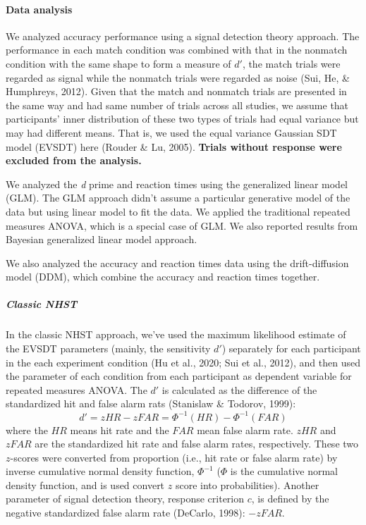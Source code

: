 \documentclass[
  english,
  man]{apa6}
\let\oldparagraph\paragraph
\renewcommand{\paragraph}[1]{\oldparagraph{#1}\mbox{}}
\let\oldsubparagraph\subparagraph
\renewcommand{\subparagraph}[1]{\oldsubparagraph{#1}\mbox{}}
\begin{document}
\hypertarget{data-analysis}{%
\paragraph{Data analysis}\label{data-analysis}}

We analyzed accuracy performance using a signal detection theory approach. The performance in each match condition was combined with that in the nonmatch condition with the same shape to form a measure of \(d'\), the match trials were regarded as signal while the nonmatch trials were regarded as noise (Sui, He, \& Humphreys, 2012). Given that the match and nonmatch trials are presented in the same way and had same number of trials across all studies, we assume that participants' inner distribution of these two types of trials had equal variance but may had different means. That is, we used the equal variance Gaussian SDT model (EVSDT) here (Rouder \& Lu, 2005). \textbf{Trials without response were excluded from the analysis.}

We analyzed the \emph{d} prime and reaction times using the generalized linear model (GLM). The GLM approach didn't assume a particular generative model of the data but using linear model to fit the data. We applied the traditional repeated measures ANOVA, which is a special case of GLM. We also reported results from Bayesian generalized linear model approach.

We also analyzed the accuracy and reaction times data using the drift-diffusion model (DDM), which combine the accuracy and reaction times together.

\hypertarget{classic-nhst}{%
\subparagraph{Classic NHST}\label{classic-nhst}}

In the classic NHST approach, we've used the maximum likelihood estimate of the EVSDT parameters (mainly, the sensitivity \(d'\)) separately for each participant in the each experiment condition (Hu et al., 2020; Sui et al., 2012), and then used the parameter of each condition from each participant as dependent variable for repeated measures ANOVA. The \(d'\) is calculated as the difference of the standardized hit and false alarm rats (Stanislaw \& Todorov, 1999):
\[ d' = zHR - zFAR = \Phi^{-1}(HR) - \Phi^{-1}(FAR) \]
where the \(HR\) means hit rate and the \(FAR\) mean false alarm rate. \(zHR\) and \(zFAR\) are the standardized hit rate and false alarm rates, respectively. These two \(z\)-scores were converted from proportion (i.e., hit rate or false alarm rate) by inverse cumulative normal density function, \(\Phi^{-1}\) (\(\Phi\) is the cumulative normal density function, and is used convert \(z\) score into probabilities). Another parameter of signal detection theory, response criterion \(c\), is defined by the negative standardized false alarm rate (DeCarlo, 1998): \(-zFAR\).
\end{document}
